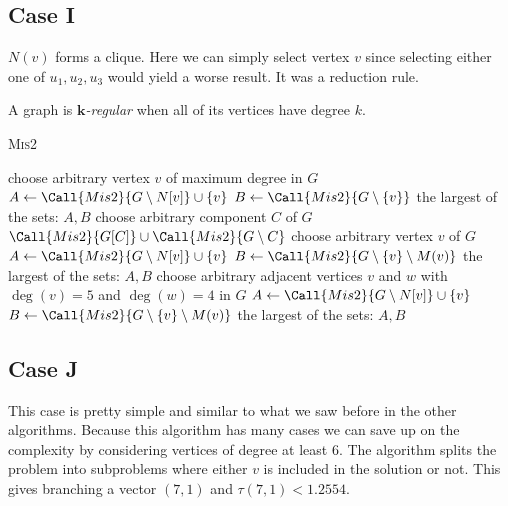\subsection{Case I}
$N(v)$ forms a clique. Here we can simply select vertex $v$ since selecting either one of $u_1, u_2, u_3$ would yield a worse result. It was a reduction rule.

\begin{defn}
A graph is $\boldsymbol{k}$\emph{-regular} when all of its vertices have degree $k$.
\end{defn}

\begin{algorithm} [H]
\caption{\textsc{Mis2}}\label{mis2:3}
\begin{algorithmic}[1]
    \State
        \State choose arbitrary vertex $v$ of maximum degree in $G$
        \State $A \gets \Call{Mis2}{G\setminus N[v]} \cup \{v\}$
        \State $B \gets \Call{Mis2}{G\setminus \{v\}}$
        \State \Return the largest of the sets: $A, B$ 
    \EndIf
    \State
        \State choose arbitrary component $C$ of $G$
        \State \Return $\Call{Mis2}{G[C]} \cup \Call{Mis2}{G\setminus C}$ 
    \EndIf
    \State
        \State choose arbitrary vertex $v$ of $G$
        \State $A \gets \Call{Mis2}{G\setminus N[v]} \cup \{v\}$
        \State $B \gets \Call{Mis2}{G\setminus \{v\} \setminus M(v)}$
        \State \Return the largest of the sets: $A, B$ 
    \EndIf
    \State
    \State choose arbitrary adjacent vertices $v$ and $w$ with $\deg(v) = 5$ and $\deg(w) = 4$ in $G$
    \State $A \gets \Call{Mis2}{G\setminus N[v]} \cup \{v\}$
    \State $B \gets \Call{Mis2}{G\setminus \{v\}  \setminus M(v)}$
    \State \Return the largest of the sets: $A, B$ 
\EndProcedure
\end{algorithmic}
\end{algorithm}

\subsection{Case J}
This case is pretty simple and similar to what we saw before in the other algorithms. Because this algorithm has many cases we can save up on the complexity by considering vertices of degree at least $6$. The algorithm splits the problem into subproblems where either $v$ is included in the solution or not. This gives branching a vector $(7,1)$ and $\tau(7,1) < 1.2554$. 


